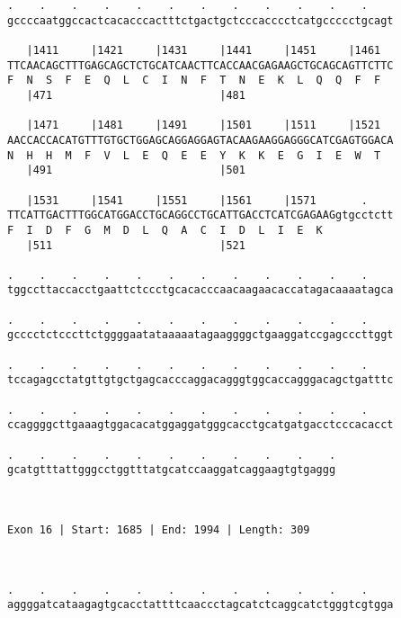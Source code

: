 \documentclass{article}
\begin{document}
\begin{Verbatim}
.    .    .    .    .    .    .    .    .    .    .    .    
gccccaatggccactcacacccactttctgactgctcccacccctcatgccccctgcagt
                                                            
   |1411     |1421     |1431     |1441     |1451     |1461  
TTCAACAGCTTTGAGCAGCTCTGCATCAACTTCACCAACGAGAAGCTGCAGCAGTTCTTC
F  N  S  F  E  Q  L  C  I  N  F  T  N  E  K  L  Q  Q  F  F  
   |471                          |481                       
  
   |1471     |1481     |1491     |1501     |1511     |1521  
AACCACCACATGTTTGTGCTGGAGCAGGAGGAGTACAAGAAGGAGGGCATCGAGTGGACA
N  H  H  M  F  V  L  E  Q  E  E  Y  K  K  E  G  I  E  W  T  
   |491                          |501                       
  
   |1531     |1541     |1551     |1561     |1571       .    
TTCATTGACTTTGGCATGGACCTGCAGGCCTGCATTGACCTCATCGAGAAGgtgcctctt
F  I  D  F  G  M  D  L  Q  A  C  I  D  L  I  E  K           
   |511                          |521                       
  
.    .    .    .    .    .    .    .    .    .    .    .    
tggccttaccacctgaattctccctgcacacccaacaagaacaccatagacaaaatagca
                                                            
.    .    .    .    .    .    .    .    .    .    .    .    
gcccctctcccttctggggaatataaaaatagaaggggctgaaggatccgagcccttggt
                                                            
.    .    .    .    .    .    .    .    .    .    .    .    
tccagagcctatgttgtgctgagcacccaggacagggtggcaccagggacagctgatttc
                                                            
.    .    .    .    .    .    .    .    .    .    .    .    
ccaggggcttgaaagtggacacatggaggatgggcacctgcatgatgacctcccacacct
                                                            
.    .    .    .    .    .    .    .    .    .    .
gcatgtttattgggcctggtttatgcatccaaggatcaggaagtgtgaggg
                                                   
                                                   
 
Exon 16 | Start: 1685 | End: 1994 | Length: 309



.    .    .    .    .    .    .    .    .    .    .    .    
aggggatcataagagtgcacctattttcaaccctagcatctcaggcatctgggtcgtgga
                                                            

\end{Verbatim}
\end{document}
